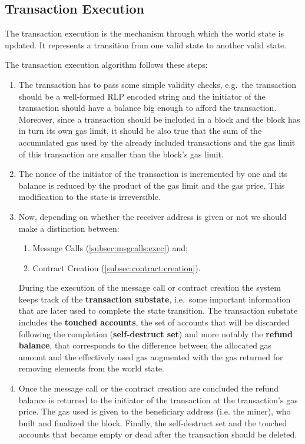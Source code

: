 \subsection{Transaction Execution}
The transaction execution is the mechanism through which the world state is
updated. It represents a transition from one
valid state to another valid state.

The transaction execution algorithm follows these steps:
\begin{enumerate}
	\item The transaction has to pass some simple validity checks, e.g.\ the
	transaction should be a well-formed RLP encoded string and the initiator
	of the transaction should have a balance big enough to afford the 
	transaction.
	Moreover, since a transaction should be included in a block and the block
	has in turn its own gas limit, it should be also true that the sum 
	of the accumulated gas used by the already included transactions and the gas
	limit of this transaction are smaller than the block's gas limit.
	\item The nonce of the initiator of the transaction is incremented by one and its balance is reduced by the product of the gas limit and the gas price. This modification to the state is irreversible.
	\item Now, depending on whether the receiver address is given or not
	we should make a distinction between:
	\begin{enumerate}[label=\alph*.]
		\item Message Calls (\autoref{subsec:msgcalls:exec}) and;
		\item Contract Creation (\autoref{subsec:contract:creation}).
	\end{enumerate}
	During the execution of the message call or contract creation the system
	keeps track of the \textbf{transaction substate}, i.e.\ some important
	information that are later used to complete the state transition.
	The transaction substate includes the \textbf{touched accounts}, the set of
	accounts that will be discarded following the completion 
	(\textbf{self-destruct set}) and more notably the
	\textbf{refund balance}, that corresponds
	to the difference between the allocated gas amount and the effectively used
	gas augmented with the gas returned for removing elements from the world
	state.
	\item Once the message call or the contract creation are concluded
	the refund balance is returned to the initiator of the transaction at the
	transaction's gas price.
	The gas used is given to the beneficiary address (i.e. the miner), who
	built and finalized the block. Finally, the self-destruct set and the
	touched accounts that became empty or dead after the transaction should
	be deleted. 
\end{enumerate}
 

